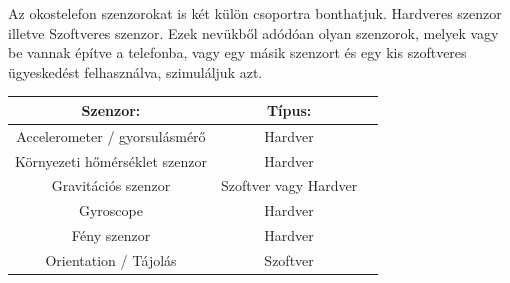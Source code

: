 \documentclass{thesis-ekf}
\theoremstyle{definition}
\theoremstyle{remark}
\begin{document}
\par Az okostelefon szenzorokat is két külön csoportra bonthatjuk. Hardveres szenzor illetve Szoftveres szenzor. Ezek nevükből adódóan olyan szenzorok, melyek vagy be vannak építve a telefonba, vagy egy másik szenzort és egy kis szoftveres ügyeskedést felhasználva, szimuláljuk azt.
\begin{center}
	\begin{tabular}{ |c|c|c| } 
		\hline
		Szenzor: & Típus: \\
		\hline\hline
		Accelerometer / gyorsulásmérő & Hardver  \\
		\hline
		Környezeti hőmérséklet szenzor & Hardver \\
		\hline
		Gravitációs szenzor & Szoftver vagy Hardver \\
		\hline
		Gyroscope & Hardver \\
		\hline
		Fény szenzor & Hardver \\
		\hline
		Orientation / Tájolás & Szoftver \\
		\hline
	\end{tabular}
\end{center}
\end{document}

